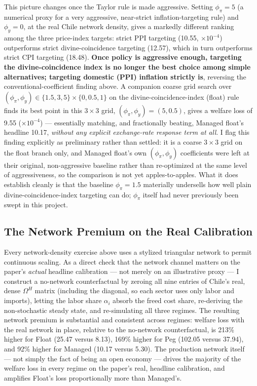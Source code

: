 \documentclass[12pt]{article}
\begin{document}
This picture changes once the Taylor rule is made aggressive. Setting $\phi_\pi=5$ (a numerical proxy
for a very aggressive, near-strict inflation-targeting rule) and $\phi_y=0$, at the real Chile network
density, gives a markedly different ranking among the three price-index targets: strict PPI targeting
(10.55, $\times10^{-4}$) outperforms strict divine-coincidence targeting (12.57), which in turn
outperforms strict CPI targeting (18.48). \textbf{Once policy is aggressive enough, targeting the
divine-coincidence index is no longer the best choice among simple alternatives; targeting domestic
(PPI) inflation strictly is}, reversing the conventional-coefficient finding above. A companion coarse
grid search over $(\phi_\pi,\phi_y)\in\{1.5,3,5\}\times\{0,0.5,1\}$ on the divine-coincidence-index
(float) rule finds its best point in this $3\times3$ grid, $(\phi_\pi,\phi_y)=(5,0.5)$, gives a welfare
loss of 9.55 ($\times10^{-4}$) --- essentially matching, and fractionally beating, Managed float's
headline 10.17, \emph{without any explicit exchange-rate response term at all}. I flag this finding
explicitly as preliminary rather than settled: it is a coarse $3\times3$ grid on the float branch only,
and Managed float's own $(\phi_\pi,\phi_y)$ coefficients were left at their original, non-aggressive
baseline rather than re-optimized at the same level of aggressiveness, so the comparison is not yet
apples-to-apples. What it does establish cleanly is that the baseline $\phi_\pi=1.5$ materially
undersells how well plain divine-coincidence-index targeting can do; $\phi_\pi$ itself had never
previously been swept in this project.

\subsection{The Network Premium on the Real Calibration}
\label{rob:network_premium}

Every network-density exercise above uses a stylized triangular network to permit continuous scaling.
As a direct check that the network channel matters on the paper's \emph{actual} headline calibration
--- not merely on an illustrative proxy --- I construct a no-network counterfactual by zeroing all
nine entries of Chile's real, dense $\Omega^H$ matrix (including the diagonal, so each sector uses
only labor and imports), letting the labor share $\alpha_i$ absorb the freed cost share, re-deriving
the non-stochastic steady state, and re-simulating all three regimes. The resulting network premium is
substantial and consistent across regimes: welfare loss with the real network in place, relative to
the no-network counterfactual, is 213\% higher for Float (25.47 versus 8.13), 169\% higher for Peg
(102.05 versus 37.94), and 92\% higher for Managed (10.17 versus 5.30). The production network itself
--- not simply the fact of being an open economy --- drives the majority of the welfare loss in every
regime on the paper's real, headline calibration, and amplifies Float's loss proportionally more than
Managed's.
\end{document}
